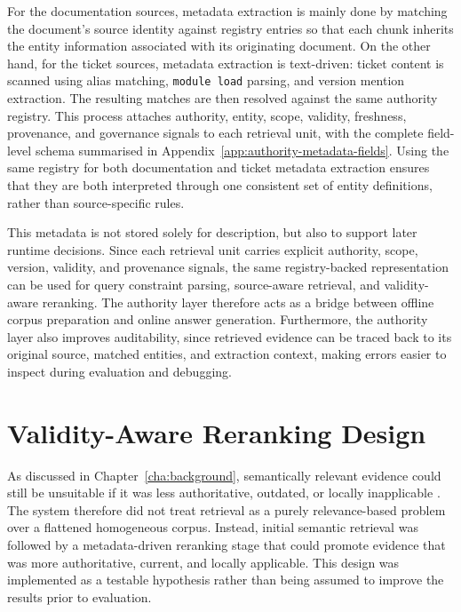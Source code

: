 For the documentation sources, metadata extraction is mainly done by matching the document's source identity against registry entries so that each chunk inherits the entity information associated with its originating document. On the other hand, for the ticket sources, metadata extraction is text-driven: ticket content is scanned using alias matching, \texttt{module load} parsing, and version mention extraction. The resulting matches are then resolved against the same authority registry. This process attaches authority, entity, scope, validity, freshness, provenance, and governance signals to each retrieval unit, with the complete field-level schema summarised in Appendix~\ref{app:authority-metadata-fields}. Using the same registry for both documentation and ticket metadata extraction ensures that they are both interpreted through one consistent set of entity definitions, rather than source-specific rules. 

This metadata is not stored solely for description, but also to support later runtime decisions. Since each retrieval unit carries explicit authority, scope, version, validity, and provenance signals, the same registry-backed representation can be used for query constraint parsing, source-aware retrieval, and validity-aware reranking. The authority layer therefore acts as a bridge between offline corpus preparation and online answer generation. Furthermore, the authority layer also improves auditability, since retrieved evidence can be traced back to its original source, matched entities, and extraction context, making errors easier to inspect during evaluation and debugging. 

\section{Validity-Aware Reranking Design}
\label{sec:validity-aware-reranking-design}

As discussed in Chapter~\ref{cha:background}, semantically relevant evidence could still be unsuitable if it was less authoritative, outdated, or locally inapplicable \citep{liYouKnowWhat2024,hwangRetrievalAugmentedGenerationEstimation2025}. The system therefore did not treat retrieval as a purely relevance-based problem over a flattened homogeneous corpus. Instead, initial semantic retrieval was followed by a metadata-driven reranking stage that could promote evidence that was more authoritative, current, and locally applicable. This design was implemented as a testable hypothesis rather than being assumed to improve the results prior to evaluation. 

